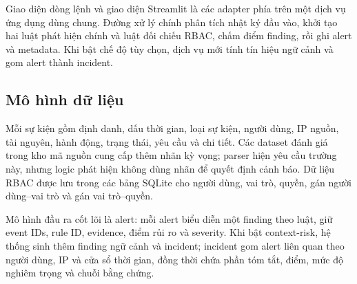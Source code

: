 Giao diện dòng lệnh và giao diện Streamlit là các adapter phía trên một dịch vụ
ứng dụng dùng chung. Đường xử lý chính phân tích nhật ký đầu vào, khởi tạo hai
luật phát hiện chính và luật đối chiếu RBAC, chấm điểm finding, rồi ghi alert và
metadata. Khi bật chế độ tùy chọn, dịch vụ mới tính tín hiệu ngữ cảnh và gom
alert thành incident.

\subsection{Mô hình dữ liệu}
\label{subsec:data-model}

Mỗi sự kiện gồm định danh, dấu thời gian, loại sự kiện, người dùng, IP nguồn,
tài nguyên, hành động, trạng thái, yêu cầu và chi tiết. Các dataset đánh giá
trong kho mã nguồn cung cấp thêm nhãn kỳ vọng; parser hiện yêu cầu trường này,
nhưng logic phát hiện không dùng nhãn để quyết định cảnh báo. Dữ liệu RBAC được
lưu trong các bảng SQLite cho người
dùng, vai trò, quyền, gán người dùng--vai trò và gán vai trò--quyền.

Mô hình đầu ra cốt lõi là alert: mỗi alert biểu diễn một finding theo luật, giữ
event IDs, rule ID, evidence, điểm rủi ro và severity. Khi bật context-risk,
hệ thống sinh thêm finding ngữ cảnh và incident; incident gom alert liên quan
theo người dùng, IP và cửa sổ thời gian, đồng thời chứa phần tóm tắt, điểm,
mức độ nghiêm trọng và chuỗi bằng chứng.
